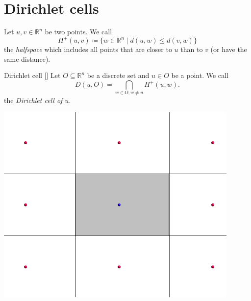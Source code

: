 \documentclass{beamer}
\theoremstyle{plain}
\newcommand\R{\mathbb R}
\begin{document}
\section{Dirichlet cells}
\begin{frame}
    \begin{definition}[Halfspace]\label{def:halfspace}
        Let $u, v \in \R^n$ be two points. 
        We call \pause
        $$
            H^+(u, v) \coloneqq \{ w \in \R^n \mid d(u,w) \leq d(v, w) \}
        $$
        the \emph{halfspace} which includes all points that are closer to $u$ than to $v$ (or have the same distance).
    \end{definition}\pause

    \begin{definition}Dirichlet cell [{{\cite[Def. III.1]{plesken2014}}}]
        Let $O\subseteq \R^n$ be a discrete set and $u \in O$ be a point.
        We call 
        $$
            D(u, O) = \bigcap_{w \in O, w \neq u} H^+(u, w).
        $$
        the \emph{Dirichlet cell of $u$}.
    \end{definition}
\end{frame}

\begin{frame}
    \begin{center}
        
        \includegraphics[width=0.9\textwidth]{images/dirichlet-example.png}
    \end{center}
\end{frame}
\end{document}

